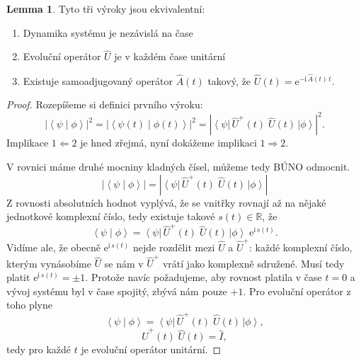 \documentclass[10pt,a4paper]{article}
\theoremstyle{definition}
\newtheorem{lemma}[theorem]{Lemma}
\newcommand{\const}[1]{\mathrm{#1}}
\newcommand{\abs}[1]{\left| #1 \right|}
\newcommand{\bra}[1]{\left< #1 \right|}
\newcommand{\ket}[1]{\left| #1 \right>}
\newcommand{\braket}[2]{\left< #1 \middle| #2 \right>}
\newcommand{\e}[1]{\const{e}^{#1}}
\renewcommand{\i}{\const{i}}
\def\R{\mathbb{R}}
\def\1{\hat{I}}
\begin{document}
\begin{lemma} \label{dyn-sys-charakteristika}
    Tyto tři výroky jsou ekvivalentní:
    \begin{enumerate}
        \item Dynamika systému je nezávislá na čase
        \item Evoluční operátor $\hat U$ je v každém čase unitární
        \item Existuje samoadjugovaný operátor $\hat A(t)$ takový, že $\hat{U}(t) = \e{-\i \, \hat{A}(t) \, t}$.
    \end{enumerate}
\end{lemma}
\begin{proof}
    Rozepíšeme si definici prvního výroku:
    \begin{equation*}
        \abs{\braket{\psi}{\phi}}^2 = \abs{\braket{\psi(t)}{\phi(t)}}^2 = \abs{\bra{\psi} \, \hat{U}^+\!(t) \; \hat{U}(t) \, \ket{\phi}}^2.
    \end{equation*}
    Implikace $1 \Leftarrow 2$ je hned zřejmá, nyní dokážeme implikaci $1 \Rightarrow 2$.

    V rovnici máme druhé mocniny kladných čísel, můžeme tedy BÚNO odmocnit.
    \begin{equation*}
        \abs{\braket{\psi}{\phi}} = \abs{\bra{\psi} \, \hat{U}^+\!(t) \; \hat{U}(t) \, \ket{\phi}}
    \end{equation*}
    Z rovnosti absolutních hodnot vyplývá, že se vnitřky rovnají až na nějaké jednotkové komplexní číslo, tedy existuje takové $s(t) \in \R$, že
    \begin{equation*}
        \braket{\psi}{\phi} = \bra{\psi} \, \hat{U}^+\!(t) \; \hat{U}(t) \, \ket{\phi} \; \e{\i \, s(t)}.
    \end{equation*}
    Vidíme ale, že obecně $\e{\i \, s(t)}$ nejde rozdělit mezi $\hat{U}$ a $\hat{U}^+$: každé komplexní číslo, kterým vynásobíme $\hat{U}$ se nám v $\hat{U}^+$ vrátí jako komplexně sdružené. Musí tedy platit $\e{\i \, s(t)} = \pm 1$. Protože navíc požadujeme, aby rovnost platila v čase $t=0$ a vývoj systému byl v čase spojitý, zbývá nám pouze $+1$. Pro evoluční operátor z toho plyne $$\braket{\psi}{\phi} = \bra{\psi} \, \hat{U}^+\!(t) \; \hat{U}(t) \, \ket{\phi},$$ $$\hat{U}^+ \!(t) \; \hat{U}(t) = \1,$$ tedy pro každé $t$ je evoluční operátor unitární.


\end{proof}
\end{document}

